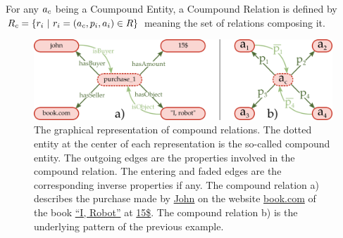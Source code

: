 \begin{theorem} 
\label{the:compound_relation}
For any $a_c$ being a Coumpound Entity, a Coumpound Relation is defined by $R_c = \{ r_i\ |\  r_i = (a_c, p_i, a_i) \in R\}$ meaning the set of relations composing it.
\end{theorem}

\begin{figure}[ht!]
\centering
\includegraphics[width=\textwidth]{figures/chapter7/CR.png}
\caption{\label{fig:chap7_cr} The graphical representation of compound relations. The dotted entity at the center of each representation is the so-called compound entity. The outgoing edges are the properties involved in the compound relation. The entering and faded edges are the corresponding inverse properties if any. The compound relation a) describes the purchase made by \underline{John} on the website \underline{book.com} of the book \underline{``I, Robot''} at \underline{15\$}. The compound relation b) is the underlying pattern of the previous example.}
\end{figure}

